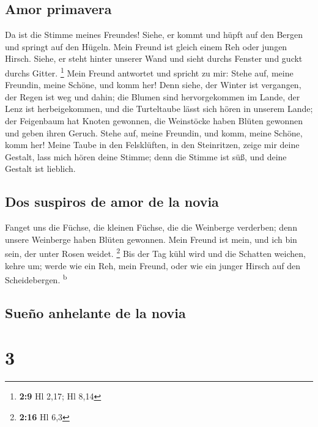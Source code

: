 \hypertarget{amor-primavera}{%
\subsection{Amor primavera}\label{amor-primavera}}

 Da ist die Stimme meines Freundes! Siehe, er kommt und
hüpft auf den Bergen und springt auf den Hügeln.  Mein
Freund ist gleich einem Reh oder jungen Hirsch. Siehe, er steht hinter
unserer Wand und sieht durchs Fenster und guckt durchs Gitter.
\footnote{\textbf{2:9} Hl 2,17; Hl 8,14}  Mein Freund
antwortet und spricht zu mir: Stehe auf, meine Freundin, meine Schöne,
und komm her!  Denn siehe, der Winter ist vergangen, der
Regen ist weg und dahin;  die Blumen sind hervorgekommen
im Lande, der Lenz ist herbeigekommen, und die Turteltaube lässt sich
hören in unserem Lande;  der Feigenbaum hat Knoten
gewonnen, die Weinstöcke haben Blüten gewonnen und geben ihren Geruch.
Stehe auf, meine Freundin, und komm, meine Schöne, komm her!
 Meine Taube in den Felsklüften, in den Steinritzen,
zeige mir deine Gestalt, lass mich hören deine Stimme; denn die Stimme
ist süß, und deine Gestalt ist lieblich.

\hypertarget{dos-suspiros-de-amor-de-la-novia}{%
\subsection{Dos suspiros de amor de la
novia}\label{dos-suspiros-de-amor-de-la-novia}}

 Fanget uns die Füchse, die kleinen Füchse, die die
Weinberge verderben; denn unsere Weinberge haben Blüten gewonnen.
 Mein Freund ist mein, und ich bin sein, der unter Rosen
weidet. \footnote{\textbf{2:16} Hl 6,3}  Bis der Tag kühl
wird und die Schatten weichen, kehre um; werde wie ein Reh, mein Freund,
oder wie ein junger Hirsch auf den Scheidebergen. \textsuperscript{b}

\hypertarget{sueuxf1o-anhelante-de-la-novia}{%
\subsection{Sueño anhelante de la
novia}\label{sueuxf1o-anhelante-de-la-novia}}

\hypertarget{section-2}{%
\section{3}\label{section-2}}

